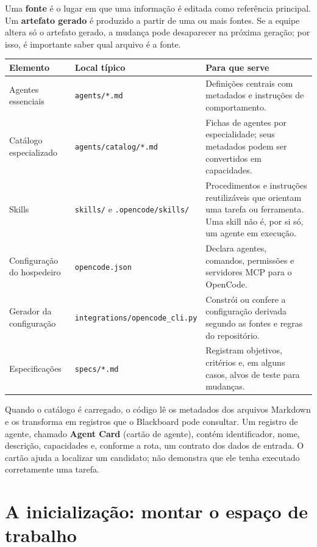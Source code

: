 \begin{conceito}
Uma \textbf{fonte} é o lugar em que uma informação é editada como referência
principal. Um \textbf{artefato gerado} é produzido a partir de uma ou mais
fontes. Se a equipe altera só o artefato gerado, a mudança pode desaparecer na
próxima geração; por isso, é importante saber qual arquivo é a fonte.
\end{conceito}

\begin{resultado}
{\footnotesize
\begin{tabularx}{\linewidth}{Y Y Y}
\toprule
Elemento & Local típico & Para que serve \\
\midrule
Agentes essenciais & \texttt{agents/*.md} & Definições centrais com metadados
e instruções de comportamento. \\
Catálogo especializado & \texttt{agents/catalog/*.md} & Fichas de agentes por
especialidade; seus metadados podem ser convertidos em capacidades. \\
Skills & \texttt{skills/} e \texttt{.opencode/skills/} & Procedimentos e
instruções reutilizáveis que orientam uma tarefa ou ferramenta. Uma skill não é,
por si só, um agente em execução. \\
Configuração do hospedeiro & \texttt{opencode.json} & Declara agentes,
comandos, permissões e servidores MCP para o OpenCode. \\
Gerador da configuração & \texttt{integrations/opencode\_cli.py} & Constrói ou
confere a configuração derivada segundo as fontes e regras do repositório. \\
Especificações & \texttt{specs/*.md} & Registram objetivos, critérios e, em
alguns casos, alvos de teste para mudanças. \\
\bottomrule
\end{tabularx}}
\end{resultado}

\begin{descricao}
Quando o catálogo é carregado, o código lê os metadados dos arquivos Markdown e
os transforma em registros que o Blackboard pode consultar. Um registro de
agente, chamado \textbf{Agent Card} (cartão de agente), contém identificador,
nome, descrição, capacidades e, conforme a rota, um contrato dos dados de
entrada. O cartão ajuda a localizar um candidato; não demonstra que ele tenha
executado corretamente uma tarefa.
\end{descricao}

\section{A inicialização: montar o espaço de trabalho}

